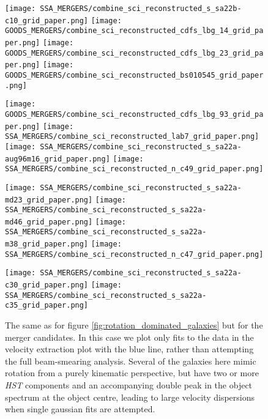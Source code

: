 \documentclass[fleqn,usenatbib]{mn2e}
\begin{document}
\begin{figure*}\ContinuedFloat
    \centering

    \texttt{[image: SSA\_MERGERS/combine\_sci\_reconstructed\_s\_sa22b-c10\_grid\_paper.png]}
    \texttt{[image: GOODS\_MERGERS/combine\_sci\_reconstructed\_cdfs\_lbg\_14\_grid\_paper.png]}
    \texttt{[image: GOODS\_MERGERS/combine\_sci\_reconstructed\_cdfs\_lbg\_23\_grid\_paper.png]}
    \texttt{[image: GOODS\_MERGERS/combine\_sci\_reconstructed\_bs010545\_grid\_paper.png]}


\end{figure*}

\begin{figure*}\ContinuedFloat
    \centering

    \texttt{[image: GOODS\_MERGERS/combine\_sci\_reconstructed\_cdfs\_lbg\_93\_grid\_paper.png]}
    \texttt{[image: SSA\_MERGERS/combine\_sci\_reconstructed\_lab7\_grid\_paper.png]}
    \texttt{[image: SSA\_MERGERS/combine\_sci\_reconstructed\_s\_sa22a-aug96m16\_grid\_paper.png]}
    \texttt{[image: SSA\_MERGERS/combine\_sci\_reconstructed\_n\_c49\_grid\_paper.png]}    


\end{figure*}

\begin{figure*}\ContinuedFloat
    \centering

    \texttt{[image: SSA\_MERGERS/combine\_sci\_reconstructed\_s\_sa22a-md23\_grid\_paper.png]}
    \texttt{[image: SSA\_MERGERS/combine\_sci\_reconstructed\_s\_sa22a-md46\_grid\_paper.png]}
    \texttt{[image: SSA\_MERGERS/combine\_sci\_reconstructed\_s\_sa22a-m38\_grid\_paper.png]}    
    \texttt{[image: SSA\_MERGERS/combine\_sci\_reconstructed\_n\_c47\_grid\_paper.png]}


\end{figure*}

\begin{figure*}\ContinuedFloat
    \centering

    \texttt{[image: SSA\_MERGERS/combine\_sci\_reconstructed\_s\_sa22a-c30\_grid\_paper.png]}
    \texttt{[image: SSA\_MERGERS/combine\_sci\_reconstructed\_s\_sa22a-c35\_grid\_paper.png]}

    \caption{The same as for figure \protect\ref{fig:rotation_dominated_galaxies} but for the merger candidates.
    In this case we plot only fits to the data in the velocity extraction plot with the blue line, rather than attempting the full beam-smearing analysis.
    Several of the galaxies here mimic rotation from a purely kinematic perspective, but have two or more {\em HST} components and an accompanying double peak in the object spectrum at the object centre, leading to large velocity dispersions when single gaussian fits are attempted.}
    \label{fig:merger_galaxies}
\end{figure*}


\bsp    %
\label{lastpage}
\end{document}

